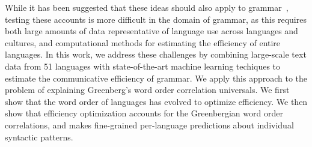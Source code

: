 \documentclass[9pt,twocolumn,twoside,lineno]{pnas-new}
\begin{document}
While it has been suggested that these ideas should also apply to grammar~\cite{hawkins2004efficiency}, testing these accounts is more difficult in the domain of grammar, as this requires both large amounts of data representative of language use across languages and cultures, and computational methods for estimating the efficiency of entire languages.
In this work, we address these challenges by combining large-scale text data from 51 languages with state-of-the-art machine learning techiques to estimate the communicative efficiency of grammar.
We apply this approach to the problem of explaining Greenberg's word order correlation universals.
We first show that the word order of languages has evolved to optimize efficiency.
We then show that efficiency optimization accounts for the Greenbergian word order correlations, and makes fine-grained per-language predictions about individual syntactic patterns.








\end{document}
